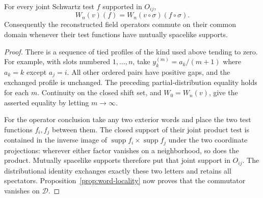 \begin{theorem}\label{thm:spacelike-exchange}
For every joint Schwartz test $f$ supported in $O_{ij}$,
\[
 W_n(v)(f)=W_n(v\circ\sigma)(f\circ\sigma).
\]
Consequently the reconstructed field operators commute on their common
domain whenever their test functions have mutually spacelike supports.
\end{theorem}
\begin{proof}
There is a sequence of tied profiles of the kind used above tending to zero.
For example, with slots numbered $1,\ldots,n$, take
$y_k^{(m)}=a_k/(m+1)$ where $a_k=k$ except $a_j=i$.
All other ordered pairs have positive gaps, and the exchanged profile is
unchanged. The preceding partial-distribution equality holds for each $m$.
Continuity on the closed shift set, and $W_0=W_n(v)$, give the asserted
equality by letting $m\to\infty$.

For the operator conclusion take any two exterior words and place the
two test functions $f_i,f_j$ between them. The closed support of their
joint product test is contained in the inverse image of
$\operatorname{supp}f_i\times\operatorname{supp}f_j$ under the two
coordinate projections: wherever either factor vanishes on a neighborhood,
so does the product. Mutually spacelike supports therefore put that joint
support in $O_{ij}$. The distributional identity exchanges exactly these
two letters and retains all spectators. Proposition~\ref{prop:word-locality}
now proves that the commutator vanishes on $\mathcal D$.
\end{proof}
